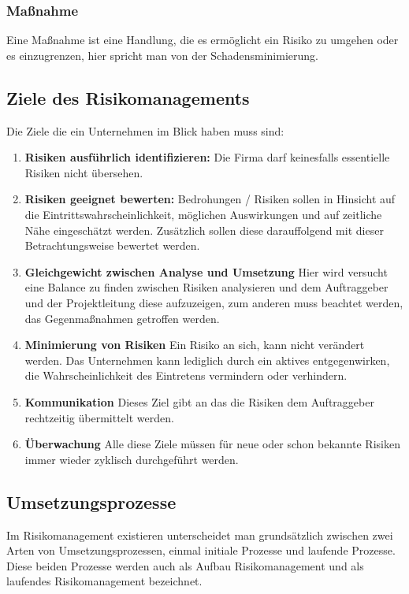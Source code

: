 \subsubsection{Maßnahme}
Eine Maßnahme ist eine Handlung, die es ermöglicht ein Risiko zu umgehen oder es einzugrenzen, hier spricht man von der Schadensminimierung. 

\subsection{Ziele des Risikomanagements}
Die Ziele die ein Unternehmen im Blick haben muss sind:
\begin{enumerate}
	\item \textbf{Risiken ausführlich identifizieren:} Die Firma darf keinesfalls essentielle Risiken nicht übersehen.
	\item \textbf{Risiken geeignet bewerten:} Bedrohungen / Risiken sollen in Hinsicht auf die Eintrittswahrscheinlichkeit, möglichen Auswirkungen und auf zeitliche Nähe eingeschätzt werden. Zusätzlich sollen diese darauffolgend mit dieser Betrachtungsweise bewertet werden.
	\item \textbf{Gleichgewicht zwischen Analyse und Umsetzung} Hier wird versucht eine Balance zu finden zwischen Risiken analysieren und dem Auftraggeber und der Projektleitung diese aufzuzeigen, zum anderen muss beachtet werden, das Gegenmaßnahmen getroffen werden.
	\item \textbf{Minimierung von Risiken} Ein Risiko an sich, kann nicht verändert werden. Das Unternehmen kann lediglich durch ein aktives entgegenwirken, die Wahrscheinlichkeit des Eintretens vermindern oder verhindern.
	\item \textbf{Kommunikation} Dieses Ziel gibt an das die Risiken dem Auftraggeber rechtzeitig übermittelt werden.
	\item \textbf{Überwachung} Alle diese Ziele müssen für neue oder schon bekannte Risiken immer wieder zyklisch durchgeführt werden. 
\end{enumerate}

\subsection{Umsetzungsprozesse}
Im Risikomanagement existieren unterscheidet man grundsätzlich zwischen zwei Arten von Umsetzungsprozessen, einmal initiale Prozesse und laufende Prozesse.
Diese beiden Prozesse werden auch als Aufbau Risikomanagement und als laufendes Risikomanagement bezeichnet.

